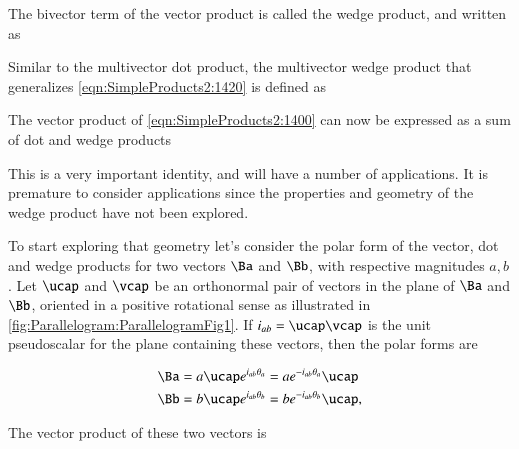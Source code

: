 The bivector term of the vector product is called the wedge product, and written as


Similar to the multivector dot product, the multivector wedge product that generalizes
\cref{eqn:SimpleProducts2:1420} is defined as


The vector product of \cref{eqn:SimpleProducts2:1400} can now be expressed as a sum of dot and wedge products


This is a very important identity, and will have a number of applications.
It is premature to consider applications since
the properties and geometry of the wedge product have not been explored.

To start exploring that geometry let's consider the polar form of the vector, dot and wedge products for two vectors \( \Ba \) and \( \Bb \), with respective magnitudes \( a, b \).
Let \( \ucap \) and \( \vcap \) be an orthonormal pair of vectors in the plane of \( \Ba \) and \( \Bb \), oriented in a positive rotational sense as illustrated in
\cref{fig:Parallelogram:ParallelogramFig1}.
If \( i_{ab} = \ucap \vcap \) is the unit pseudoscalar for the plane containing these vectors, then the polar forms are

\begin{dmath}\label{eqn:SimpleProducts2:1660}
\begin{aligned}
\Ba &= a \ucap e^{ i_{ab} \theta_a } = a e^{ -i_{ab} \theta_a } \ucap \\
\Bb &= b \ucap e^{ i_{ab} \theta_b } = b e^{ -i_{ab} \theta_b } \ucap,
\end{aligned}
\end{dmath}

The vector product of these two vectors is

